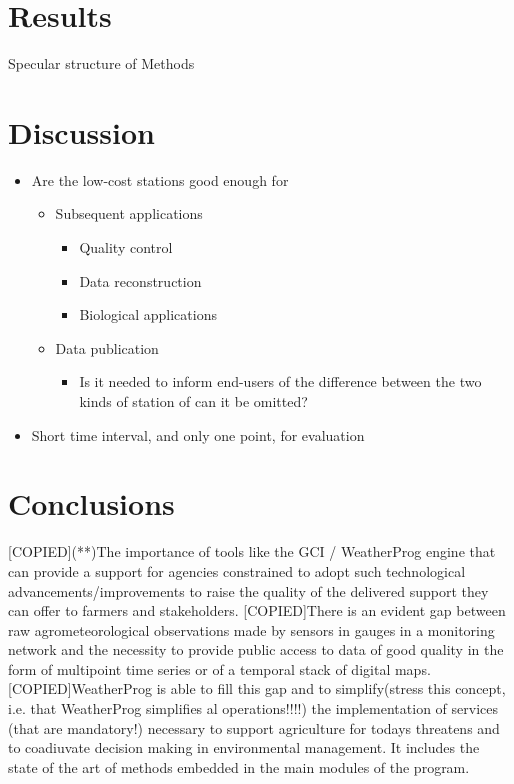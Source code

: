 \documentclass[authoryear,preprint,review,12pt]{elsarticle}
\begin{document}
\section{Results}
Specular structure of Methods

\section{Discussion}
\begin{itemize}
    \item Are the low-cost stations good enough for
    \begin{itemize}
        \item Subsequent applications
        \begin{itemize}
            \item Quality control
            \item Data reconstruction
            \item Biological applications
        \end{itemize}
        \item Data publication
        \begin{itemize}
            \item Is it needed to inform end-users of the difference between the two kinds of station of can it be omitted?
        \end{itemize}
    \end{itemize}
    \item Short time interval, and only one point, for evaluation
\end{itemize}

\section{Conclusions}
[COPIED](**)The importance of tools like the GCI / WeatherProg engine that can provide a support for agencies constrained to adopt such technological advancements/improvements to raise the quality of the delivered support they can offer to farmers and stakeholders.
[COPIED]There is an evident gap between raw agrometeorological observations made by sensors in gauges in a monitoring network and the necessity to provide public access to data of good quality in the form of multipoint time series or of a temporal stack of digital maps.
[COPIED]WeatherProg is able to fill this gap and to simplify(stress this concept, i.e. that WeatherProg simplifies al operations!!!!) the implementation of services (that are mandatory!) necessary to support agriculture for todays threatens and to coadiuvate decision making in environmental management. It includes the state of the art of methods embedded in the main modules of the program.
\end{document}
